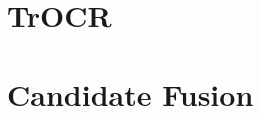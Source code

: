 \label{chap:2_related_work}
\section{TrOCR}
\label{sec:2_trocr}
\section{Candidate Fusion}
\label{sec:2_candidate_fusion}